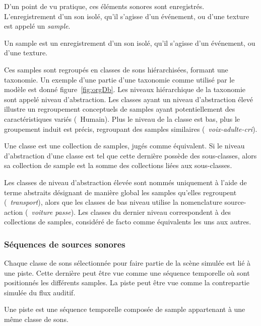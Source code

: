 D'un point de vu pratique, ces éléments sonores sont enregistrés. L'enregistrement d'un son isolé, qu'il s'agisse d'un événement, ou d'une texture est appelé un \emph{sample}. 

\begin{mydef}
Un sample est un enregistrement d'un son isolé, qu'il s'agisse d'un événement, ou d'une texture.
\end{mydef}


Ces samples sont regroupés en classes de sons hiérarchisées, formant une taxonomie. Un exemple d'une partie d'une taxonomie comme utilisé par le modèle est donné figure~\ref{fig:orgDb}. Les niveaux hiérarchique de la taxonomie sont appelé niveau d'abstraction.  Les classes ayant un niveau d'abstraction élevé illustre un regroupement conceptuels de samples ayant potentiellement des caractéristiques variés (\ie~{Humain}). Plus le niveau de la classe est bas, plus le groupement induit est précis, regroupant des samples similaires (\ie~\emph{voix-adulte-cri}). 

\begin{mydef}
Une classe est une collection de samples, jugés comme équivalent. Si le niveau d'abstraction d'une classe est tel que cette dernière possède des sous-classes, alors sa collection de sample est la somme des collections liées aux sous-classes.
\end{mydef}

Les classes de niveau d'abstraction élevée sont nommés uniquement à l'aide de terme abstraits désignant de manière global les samples qu'elles regroupent (\eg~\emph{transport}), alors que les classes de bas niveau utilise la nomenclature source-action (\eg~\emph{voiture passe}). Les classes du dernier niveau correspondent à des collections de samples, considéré de facto comme équivalents les uns aux autres.

\subsubsection{Séquences de sources sonores}

Chaque classe de sons sélectionnée pour faire partie de la scène simulée est lié à une piste. Cette dernière peut être vue comme une séquence temporelle où sont positionnés les différents samples. La piste peut être vue comme la contrepartie simulée du flux auditif.

\begin{mydef}
Une piste est une séquence temporelle composée de sample appartenant à une même classe de sons.
\end{mydef}

